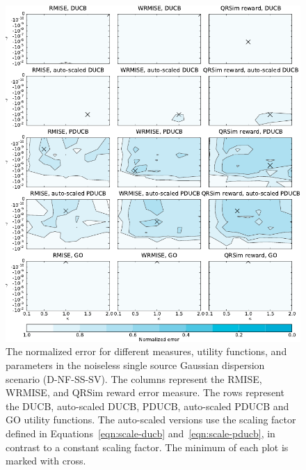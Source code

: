 \begin{figure}
    \centering
    \includegraphics{plots/psearch-D-NF-SS-SV}
    \caption[Normalized error (D-NF-SS-SV)]{The normalized error for different 
        measures, utility functions, and parameters in the noiseless single 
        source Gaussian dispersion scenario (D-NF-SS-SV).  The columns represent 
        the RMISE, WRMISE, and QRSim reward error measure.  The rows represent 
        the DUCB, auto-scaled DUCB, PDUCB, auto-scaled PDUCB and GO utility 
        functions. The auto-scaled versions use the scaling factor defined in 
        Equations~\ref{eqn:scale-ducb} and~\ref{eqn:scale-pducb}, in contrast to 
        a constant scaling factor.  The minimum of each plot is marked with 
        cross.}\label{fig:psearch-D-NF-SS-SV}
\end{figure}

